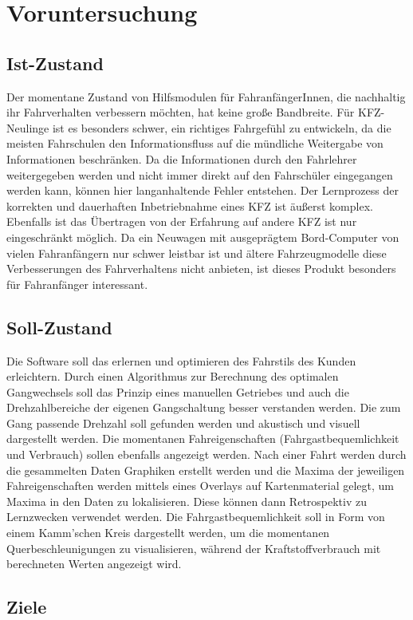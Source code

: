 \chapter{Voruntersuchung}
\section{Ist-Zustand}
Der momentane Zustand von Hilfsmodulen für FahranfängerInnen, die nachhaltig ihr Fahrverhalten verbessern möchten, hat keine große Bandbreite. Für KFZ-Neulinge ist es besonders schwer, ein richtiges Fahrgefühl zu entwickeln, da die meisten Fahrschulen den Informationsfluss auf die mündliche Weitergabe von Informationen beschränken. Da die Informationen durch den Fahrlehrer weitergegeben werden und nicht immer direkt auf den Fahrschüler eingegangen werden kann, können hier langanhaltende Fehler entstehen. Der Lernprozess der korrekten und dauerhaften Inbetriebnahme eines KFZ ist äußerst komplex. Ebenfalls ist das Übertragen von der Erfahrung auf andere KFZ ist nur eingeschränkt möglich.
Da ein Neuwagen mit ausgeprägtem Bord-Computer von vielen Fahranfängern nur schwer leistbar ist und ältere Fahrzeugmodelle diese Verbesserungen des Fahrverhaltens nicht anbieten, ist dieses Produkt besonders für Fahranfänger interessant.
\section{Soll-Zustand}
Die Software soll das erlernen und optimieren des Fahrstils des Kunden erleichtern. Durch einen Algorithmus zur Berechnung des optimalen Gangwechsels soll das Prinzip eines manuellen Getriebes und auch die Drehzahlbereiche der eigenen Gangschaltung besser verstanden werden. Die zum Gang passende Drehzahl soll gefunden werden und akustisch und visuell dargestellt werden. Die momentanen Fahreigenschaften (Fahrgastbequemlichkeit und Verbrauch) sollen ebenfalls angezeigt werden. \newpage Nach einer Fahrt werden durch die gesammelten Daten Graphiken erstellt werden und die Maxima der jeweiligen Fahreigenschaften werden mittels eines Overlays auf Kartenmaterial gelegt, um Maxima in den Daten zu lokalisieren. Diese können dann Retrospektiv zu Lernzwecken verwendet werden. Die Fahrgastbequemlichkeit soll in Form von einem Kamm'schen Kreis dargestellt werden, um die momentanen Querbeschleunigungen zu visualisieren, während der Kraftstoffverbrauch mit berechneten Werten angezeigt wird.
\section{Ziele}

